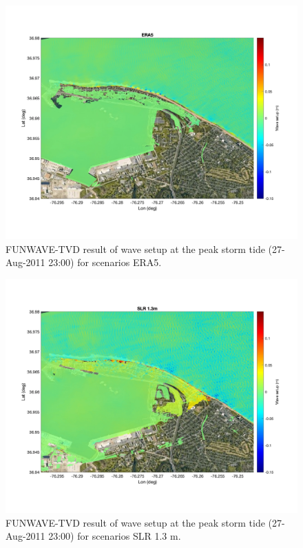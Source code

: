 \documentclass[preprint,12pt,authoryear] {elsarticle}
\begin{document}
\begin{figure}
\centering
\includegraphics[width=\textwidth]{./figures/funwave_ERA5_setup.jpg}
\caption{FUNWAVE-TVD result of wave setup at the peak storm tide (27-Aug-2011 23:00) for scenarios ERA5.  }
\label{funwave_ERA5_setup}
\centering
\end{figure}

\begin{figure}
\centering
\includegraphics[width=\textwidth]{./figures/funwave_SLR_setup.jpg}
\caption{FUNWAVE-TVD result of wave setup at the peak storm tide (27-Aug-2011 23:00) for scenarios SLR 1.3 m. }
\label{funwave_SLR_setup}
\centering
\end{figure}
\end{document}
